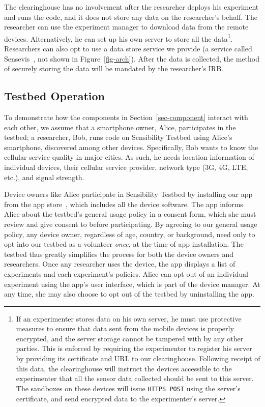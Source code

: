 {{The clearinghouse has no involvement after the researcher deploys 
his experiment and runs the code, and it does not store any
data on the researcher's behalf. The researcher
can use the experiment manager to download data from the remote devices. 
Alternatively, he can set up his own server to store all the data\footnote{\scriptsize
If an experimenter stores data on his own server, he must use protective
measures to ensure that data sent from the mobile devices is
properly encrypted, and the server storage cannot be tampered
with by any other parties. This is enforced by requiring the experimenter to register
his server by providing its certificate and URL to our
clearinghouse. Following receipt of this data, the clearinghouse will instruct the devices
accessible to the experimenter that all the sensor data collected should be
sent to this server. The sandboxes on these devices will issue
\texttt{HTTPS POST} using the server's certificate, and send encrypted
data to the experimenter's server.}. Researchers can also opt to use a data 
store service we provide (a service called Sensevis~\cite{sensevis}, 
not shown in Figure~\ref{fig-arch}). After the data is collected, the method of securely storing
the data will be mandated by the researcher's IRB.

\subsection{Testbed Operation}\label{sec-ops}

To demonstrate how the components in Section~\ref{sec-component} 
interact with each other, we assume 
that a smartphone owner, Alice, participates in the testbed; a researcher, Bob, 
runs code on Sensibility Testbed using Alice's smartphone, discovered among other
devices. Specifically, Bob wants to know the cellular service
quality in major cities. As such, he needs location information
of individual devices, their cellular service provider, network
type (3G, 4G, LTE, etc.), and signal strength. 

Device owners like Alice participate in Sensibility Testbed by installing our
app from the app store~\cite{sensibility-app}, which includes all the device 
software. The app informs Alice about the testbed's general usage policy 
in a consent form, which she must review and give consent to before
participating. By agreeing to our general usage policy, any device 
owner, regardless of age, country, or background, need only to opt into our testbed as a
volunteer \textit{once}, at the time of app installation. The testbed thus greatly simplifies the process for both the 
device owners and researchers. Once any researcher uses the device, the 
app displays a list of experiments and each experiment's policies. 
Alice can opt out of an individual experiment using the
app's user interface, which is part of the device manager. At any time, she may also choose 
to opt out of the testbed by uninstalling the app.

}}
